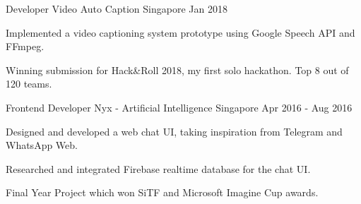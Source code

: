 

\begin{cventries}

  \cventry
    {Developer} %
    {Video Auto Caption} %
    {Singapore} %
    {Jan 2018} %
    {
      \begin{cvitems} %
        \item {Implemented a video captioning system prototype using Google Speech API and FFmpeg.}
        \item {Winning submission for Hack\&Roll 2018, my first solo hackathon. Top 8 out of 120 teams.}
      \end{cvitems}
    }

  \cventry
    {Frontend Developer} %
    {Nyx - Artificial Intelligence} %
    {Singapore} %
    {Apr 2016 - Aug 2016} %
    {
      \begin{cvitems} %
        \item {Designed and developed a web chat UI, taking inspiration from Telegram and WhatsApp Web.}
        \item {Researched and integrated Firebase realtime database for the chat UI.}
        \item {Final Year Project which won SiTF and Microsoft Imagine Cup awards.}
      \end{cvitems}
    }

\end{cventries}
